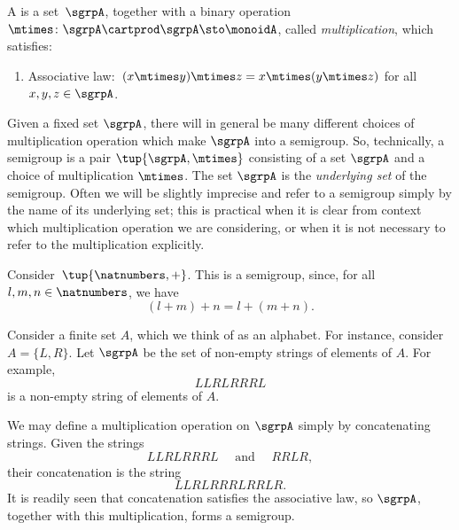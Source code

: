 
\section{}\label{sec:semigroups}


\begin{definition}[Semigroup]
  \label{def:semigroup}
  A \emph{} is a set~$\sgrpA$, together with a binary operation~$\mtimes \colon \sgrpA \cartprod \sgrpA \sto \monoidA$, called \emph{multiplication}, which satisfies:
  \begin{enumerate}
    \item Associative law:~$(x\mtimes y)\mtimes z=x\mtimes (y\mtimes z)$ for all $x , y, z \in \sgrpA$.
  \end{enumerate}
\end{definition}

\begin{remark}
Given a fixed set $\sgrpA$, there will in general be many different choices of multiplication operation which make $\sgrpA$ into a semigroup. So, technically, a semigroup is a pair $\tup{\sgrpA, \mtimes}$ consisting of a set $\sgrpA$ and a choice of multiplication $\mtimes$. The set $\sgrpA$ is the \emph{underlying set} of the semigroup. Often we will be slightly imprecise and refer to a semigroup simply by the name of its underlying set; this is practical when it is clear from context which multiplication operation we are considering, or when it is not necessary to refer to the multiplication explicitly.
\end{remark}

\begin{example}\label{natnum-semigroup}
  Consider~$\tup{\natnumbers,+}$. This is a semigroup, since, for all~$l,m, n \in \natnumbers$, we have
  \begin{equation*}
  (l+m)
    +n=l+(m+n).
  \end{equation*}
\end{example}

\begin{example}\label{string-semigroup}
Consider a finite set $A$, which we think of as an alphabet. For instance, consider $A = \{ L, R \}$.
Let $\sgrpA$ be the set of non-empty strings of elements of $A$. For example,
$$ LLRLRRRL $$
is a non-empty string of elements of $A$.

We may define a multiplication operation on $\sgrpA$ simply by concatenating strings. Given the strings
$$ LLRLRRRL  \quad \text{ and } \quad RRLR, $$
their concatenation is the string
$$ LLRLRRRLRRLR.$$
It is readily seen that concatenation satisfies the associative law, so $\sgrpA$, together with this multiplication, forms a semigroup.
\end{example}





